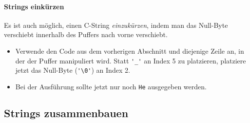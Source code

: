 \paragraph{Strings einkürzen}
Es ist auch möglich, einen C-String \emph{einzukürzen}, indem man das Null-Byte verschiebt innerhalb des Puffers nach vorne verschiebt.
\begin{itemize}
\item
Verwende den Code aus dem vorherigen Abschnitt und diejenige Zeile an, in der der Puffer manipuliert wird.
Statt \lstinline|'_'| an Index 5 zu platzieren, platziere jetzt das Null-Byte (\lstinline|'\0'|) an Index 2.
\item 
Bei der Ausführung sollte jetzt nur noch \texttt{He} ausgegeben werden.
\end{itemize}

\subsection{Strings zusammenbauen}

